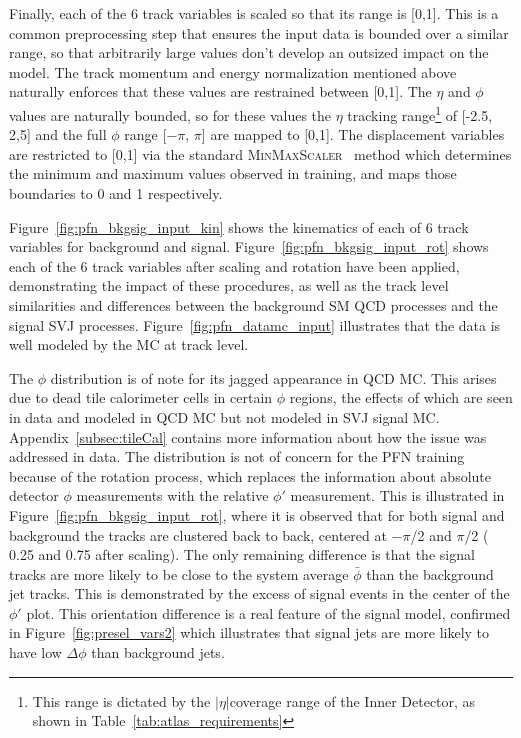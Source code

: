 Finally, each of the 6 track variables is scaled so that its range is [0,1]. This is a common preprocessing step that ensures the input data is bounded over a similar range, so that arbitrarily large values don't develop an outsized impact on the model. The track momentum and energy normalization mentioned above naturally enforces that these values are restrained between [0,1]. The $\eta$ and $\phi$ values are naturally bounded, so for these values the $\eta$ tracking range\footnote{This range is dictated by the $|\eta|$coverage range of the Inner Detector, as shown in Table~\ref{tab:atlas_requirements}} of [-2.5, 2,5] and the full $\phi$ range [$-\pi$, $\pi$] are mapped to [0,1]. The displacement variables are restricted to [0,1] via the standard \textsc{MinMaxScaler}~\cite{scikit-learn} method which determines the minimum and maximum values observed in training, and maps those boundaries to 0 and 1 respectively. \par

Figure~\ref{fig:pfn_bkgsig_input_kin} shows the kinematics of each of 6 track variables for background and signal. Figure~\ref{fig:pfn_bkgsig_input_rot} shows each of the 6 track variables after scaling and rotation have been applied, demonstrating the impact of these procedures, as well as the track level similarities and differences between the background SM QCD processes and the signal SVJ processes. Figure~\ref{fig:pfn_datamc_input} illustrates that the data is well modeled by the MC at track level. \par

The $\phi$ distribution is of note for its jagged appearance in QCD MC. This arises due to dead tile calorimeter cells in certain $\phi$ regions, the effects of which are seen in data and modeled in QCD MC but not modeled in SVJ signal MC. Appendix~\ref{subsec:tileCal} contains more information about how the issue was addressed in data. The distribution is not of concern for the PFN training because of the rotation process, which replaces the information about absolute detector $\phi$ measurements with the relative $\phi'$ measurement. This is illustrated in Figure~\ref{fig:pfn_bkgsig_input_rot}, where it is observed that for both signal and background the tracks are clustered back to back, centered at $-\pi$/2 and $\pi$/2 ( 0.25 and 0.75 after scaling). The only remaining difference is that the signal tracks are more likely to be close to the system average $\bar{\phi}$ than the background jet tracks. This is demonstrated by the excess of signal events in the center of the $\phi'$ plot. This orientation difference is a real feature of the signal model, confirmed in Figure~\ref{fig:presel_vars2} which illustrates that signal jets are more likely to have low $\Delta\phi$ than background jets. 

